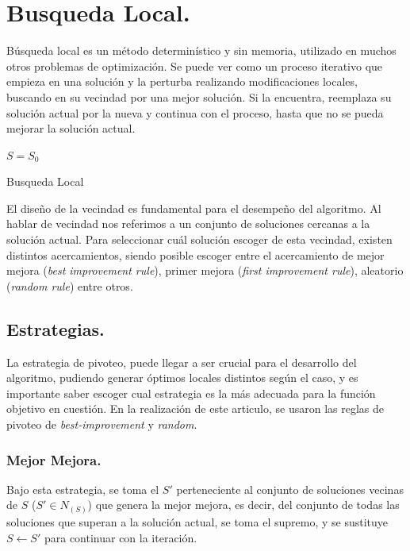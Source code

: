\documentclass{ci5652}
\begin{document}
\section{Busqueda Local.}
	Búsqueda local es un método determinístico y sin memoria, utilizado en muchos otros problemas de optimización. Se puede ver como un proceso iterativo que empieza en una solución y la perturba realizando modificaciones locales, buscando en su vecindad por una mejor solución. Si la encuentra, reemplaza su solución actual por la nueva y continua con el proceso, hasta que no se pueda mejorar la solución actual.\\

	\begin{algorithm}
		\DontPrintSemicolon
		\vspace*{0.1cm}
		$S = S_0$\;
		\vspace*{0.1cm}
		\caption{Busqueda Local}
	\end{algorithm}
		
	El diseño de la vecindad es fundamental para el desempeño del algoritmo. Al hablar de vecindad nos referimos a un conjunto de soluciones cercanas a la solución actual. Para seleccionar cuál solución escoger de esta vecindad, existen distintos acercamientos, siendo posible escoger entre el acercamiento de mejor mejora (\textit{best improvement rule}), primer mejora (\textit{first improvement rule}), aleatorio (\textit{random rule}) entre otros.\\

	\subsection{Estrategias.} 
		La estrategia de pivoteo, puede llegar a ser crucial para el desarrollo del algoritmo, pudiendo generar óptimos locales distintos según el caso, y es importante saber escoger cual estrategia es la más adecuada para la función objetivo en cuestión.
		En la realización de este articulo, se usaron las reglas de pivoteo de \textit{best-improvement} y \textit{random}.
		
		\subsubsection{Mejor Mejora.}
			Bajo esta estrategia, se toma el $S'$ perteneciente al conjunto de soluciones vecinas de $S$ ($S' \in N_{(S)}$) que genera la mejor mejora, es decir, del conjunto de todas las soluciones que superan a la solución actual, se toma el supremo, y se sustituye $S \leftarrow S'$ para continuar con la iteración.
		
\end{document}
